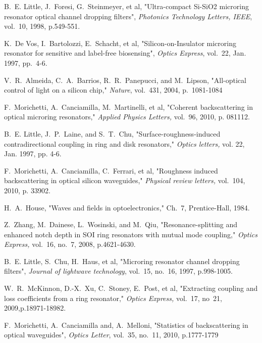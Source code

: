 \documentclass[conference,letterpaper,final]{IEEEtran}
\begin{document}
\begin{thebibliography}{10}

B.~E. Little, J.~Foresi, G.~Steinmeyer, et al, "Ultra-compact Si-SiO2 microring resonator optical channel dropping filters", \emph{Photonics Technology Letters, IEEE}, vol.~10, 1998, p.549-551.

K.~De Vos, I.~Bartolozzi, E.~Schacht, et al, "Silicon-on-Insulator microring resonator for sensitive and label-free biosensing", \emph{Optics Express}, vol.~22, Jan. 1997, pp.~4-6.

V.~R.~Almeida, C.~A.~Barrios, R.~R.~Panepucci, and M.~Lipson, "All-optical control of light on a silicon chip," \emph{Nature}, vol.~431, 2004, p.~1081-1084

F.~Morichetti, A.~Canciamilla, M.~Martinelli, et al, "Coherent backscattering in optical microring resonators," \emph{Applied Physics Letters, }vol.~96, 2010, p. 081112.

B.~E. Little, J.~P.~Laine, and S.~T.~Chu, "Surface-roughness-induced contradirectional coupling in ring and disk resonators," \emph{Optics letters, } vol. 22, Jan. 1997, pp. 4-6.

F.~Morichetti, A.~Canciamilla, C.~Ferrari, et al, "Roughness induced backscattering in optical silicon waveguides," \emph{Physical review letters,} vol.~104, 2010, p. 33902.

H.~A.~House, "Waves and fields in optoelectronics," Ch.~7, Prentice-Hall, 1984.

Z.~Zhang, M.~Dainese, L.~Wosinski, and M.~Qiu, "Resonance-splitting and enhanced notch depth in SOI ring resonators with mutual mode coupling," \emph{Optics Express, } vol.~16, no.~7, 2008, p.4621-4630.

B.~E. Little, S.~Chu, H.~Haus, et al, "Microring resonator channel dropping filters", \emph{Journal of lightwave technology}, vol.~15, no.~16, 1997, p.998-1005.

W.~R.~McKinnon, D.-X.~Xu, C.~Stoney, E.~Post, et al, "Extracting coupling and loss coefficients from a ring resonator," \emph{Optics Express, } vol.~17, no~21, 2009,p.18971-18982.

F.~Morichetti, A.~Canciamilla and, A.~Melloni, "Statistics of backscattering in optical waveguides", \emph{Optics Letter}, vol.~35, no.~11, 2010, p.1777-1779

\end{thebibliography}


\end{document}
